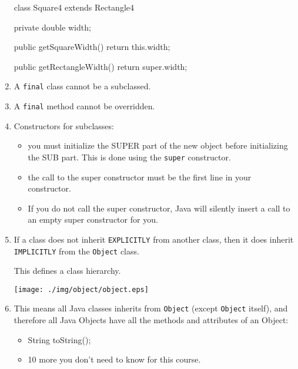 \documentclass[a4paper, 9pt]{extarticle}
\begin{document}
\begin{enumerate}
\begin{blackboard}
class Square4 extends Rectangle4 {
  private double width;

  public getSquareWidth() {
    return this.width;
  }

  public getRectangleWidth() {
    return super.width;
  }
}
\end{blackboard}

  \item A \verb+final+ class cannot be a subclassed.

  \item A \verb+final+ method cannot be overridden.

  \item Constructors for subclasses:

    \begin{itemize}

      \item you must initialize the SUPER part of the new object before
        initializing the SUB part. This is done using the \verb+super+
        constructor.

      \item the call to the super constructor must be the first line in your
        constructor.

      \item If you do not call the super constructor, Java will silently insert
        a call to an empty super constructor for you.

    \end{itemize}

  \item If a class does not inherit \verb+EXPLICITLY+ from another class, then
    it does inherit \verb+IMPLICITLY+ from the \verb+Object+ class.

    This defines a class hierarchy.

    \begin{center}
      \texttt{[image: ./img/object/object.eps]}
    \end{center}

  \item This means all Java classes inherits from \verb+Object+ (except
    \verb+Object+ itself), and therefore all Java Objects have all the methods and
    attributes of an Object:

      \begin{itemize}

        \item String toString();

        \item 10 more you don't need to know for this course.

      \end{itemize}

\end{enumerate}
\end{document}
